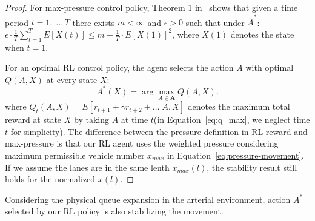 \begin{proof}For max-pressure control policy, Theorem 1 in~\cite{MP13} shows that given a time period $t=1,\ldots,T$ there exists $m<\infty$ and $\epsilon>0$ such that under $\tilde{A}^*$:
$\epsilon\cdot\frac{1}{T}\sum_{t=1}^TE[X(t)]\leq m + \frac{1}{T}\cdot E[X(1)]^2
$, 
where $X(1)$ denotes the state when $t=1$. 

For an optimal RL control policy, the agent selects the action $A$ with optimal $Q (A,X)$ at every state $X$:
\begin{equation}
\label{eq:q_max}
A^*(X) = \arg\max_{A\in \pmb{A}}Q(A, X).
\end{equation}
where $Q_t(A,X)= E[r_{t+1}+\gamma r_{t+2}+\dots | A, X]$ denotes the maximum total reward at state $X$ by taking $A$ at time $t$(in Equation~\eqref{eq:q_max}, we neglect time $t$ for simplicity).
The difference between the pressure definition in RL reward and max-pressure is that our RL agent uses the weighted pressure considering maximum permissible vehicle number $x_{max}$ in Equation~\eqref{eq:pressure-movement}. If we assume the lanes are in the same lenth $x_{max}(l)$, the stability result still holds for the normalized $x(l)$.
\end{proof}

\begin{theorem}
\label{theo:stable} Considering the physical queue expansion in the arterial environment, action $A^*$ selected by our RL policy is also stabilizing the movement.
\end{theorem}



